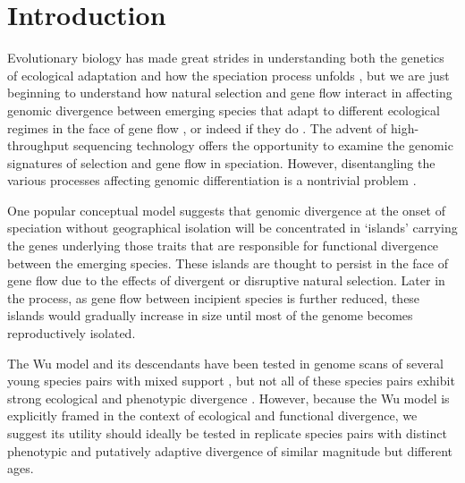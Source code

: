 \section{Introduction}

Evolutionary biology has made great strides in understanding both the genetics of ecological adaptation \cite{hoekstra_single_2006, Schluter16062009, arnegard_genetics_2014} and how the speciation process unfolds \cite{coyne2004speciatjon, gavrilets2004fitness, noor2006speciation, seehausen2014genomics}, but we are just beginning to understand how natural selection and gene flow interact in affecting genomic divergence between emerging species that adapt to different ecological regimes in the face of gene flow \cite{feder2012genomics}, or indeed if they do \cite{bierne2013pervasive}. The advent of high-throughput sequencing technology offers the opportunity to examine the genomic signatures of selection and gene flow in speciation. However, disentangling the various processes affecting genomic differentiation is a nontrivial problem \cite{charlesworth1998measures, noor2009islands, cruickshank2014reanalysis}.

One popular conceptual model \cite{wu2001genic} suggests that genomic divergence at the onset of speciation without geographical isolation will be concentrated in ‘islands’ carrying the genes underlying those traits that are responsible for functional divergence between the emerging species. These islands are thought to persist in the face of gene flow due to the effects of divergent or disruptive natural selection. Later in the process, as gene flow between incipient species is further reduced, these islands would gradually increase in size until most of the genome becomes reproductively isolated.

The Wu \cite{wu2001genic} model and its descendants \cite{wu2004genes, via2008genetic, feder2012genomics} have been tested in genome scans of several young species pairs with mixed support \cite{turner2005genomic, ellegren2012genomic, gagnaire2013genetic, martin_genome-wide_2013, renaut2013genomic, ruegg2014role}, but not all of these species pairs exhibit strong ecological and phenotypic divergence \cite{harr2006genomic, carneiro2010speciation}. However, because the Wu model is explicitly framed in the context of ecological and functional divergence, we suggest its utility should ideally be tested in replicate species pairs with distinct phenotypic and putatively adaptive divergence of similar magnitude but different ages.

